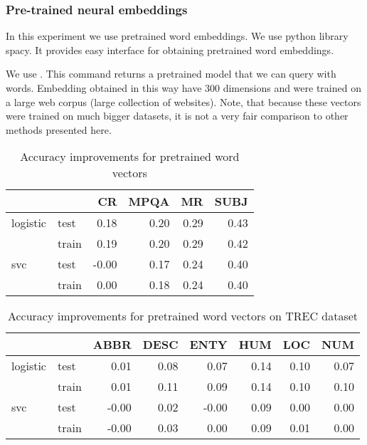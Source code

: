     \subsubsection{Pre-trained neural embeddings}    
    
    In this experiment we use pretrained word embeddings. 
    We use python library spacy.
    It provides easy interface for obtaining pretrained word embeddings.
    
    We use .
    This command returns a pretrained model that we can query with words. 
    Embedding obtained in this way have $300$ dimensions and were trained on a large web corpus (large collection of websites). 
    Note, that because these vectors were trained on much bigger datasets, it is not a very fair comparison to other methods presented here.

\begin{table}[h]
\begin{center}

\begin{tabular}{llrrrr}
\toprule
 &&CR &MPQA &MR &SUBJ \\
\midrule
logistic & test & 0.18 & 0.20 & 0.29 & 0.43 \\
 & train & 0.19 & 0.20 & 0.29 & 0.42 \\
svc & test &-0.00 & 0.17 & 0.24 & 0.40 \\
 & train & 0.00 & 0.18 & 0.24 & 0.40 \\
\bottomrule
\end{tabular}

\caption[Accuracy improvements for pretrained word vectors]{Accuracy improvements for pretrained word vectors}
\label{tab:res:pretrainedwordvec}
\end{center}
\end{table}



\begin{table}[H]
\begin{center}

\begin{tabular}{llrrrrrr}
\toprule
 &&ABBR &DESC &ENTY &HUM &LOC &NUM \\
\midrule
logistic & test &0.01 &0.08 &0.07 & 0.14 & 0.10 & 0.07 \\
 & train &0.01 &0.11 &0.09 & 0.14 & 0.10 & 0.10 \\
svc & test & -0.00 &0.02 & -0.00 & 0.09 & 0.00 & 0.00 \\
 & train & -0.00 &0.03 &0.00 & 0.09 & 0.01 & 0.00 \\
\bottomrule
\end{tabular}

\caption[Accuracy improvements for pretrained word vectors on TREC dataset]{Accuracy improvements for pretrained word vectors on TREC dataset}
\label{tab:res:pretrainedwordvec:trec}
\end{center}
\end{table}

